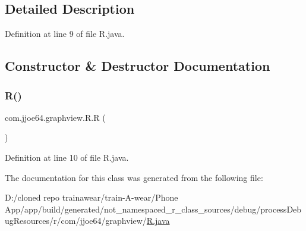 \subsection{Detailed Description}


Definition at line 9 of file R.\+java.



\subsection{Constructor \& Destructor Documentation}
\mbox{\label{classcom_1_1jjoe64_1_1graphview_1_1_r_a7be993fb9c843ee7caa4549a95ce8d12}} 
\subsubsection{\texorpdfstring{R()}{R()}}
{\footnotesize\ttfamily com.\+jjoe64.\+graphview.\+R.\+R (\begin{DoxyParamCaption}{ }\end{DoxyParamCaption})\hspace{0.3cm}{\ttfamily [private]}}



Definition at line 10 of file R.\+java.


\begin{DoxyCode}{0}

\end{DoxyCode}


The documentation for this class was generated from the following file\+:\begin{DoxyCompactItemize}
\item 
D\+:/cloned repo trainawear/train-\/\+A-\/wear/\+Phone App/app/build/generated/not\+\_\+namespaced\+\_\+r\+\_\+class\+\_\+sources/debug/process\+Debug\+Resources/r/com/jjoe64/graphview/\mbox{\hyperlink{process_debug_resources_2r_2com_2jjoe64_2graphview_2_r_8java}{R.\+java}}\end{DoxyCompactItemize}
